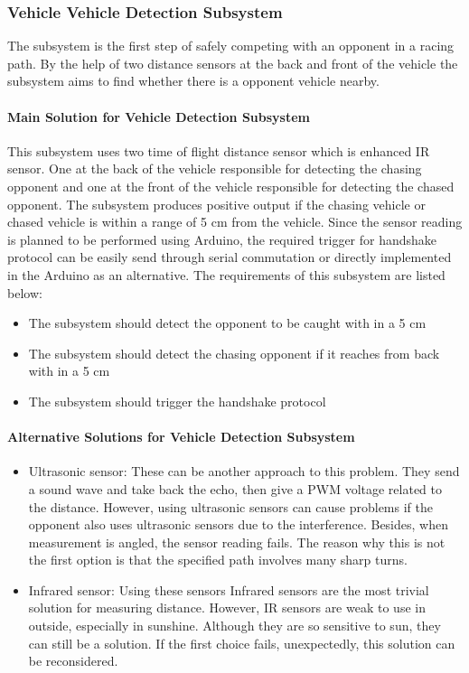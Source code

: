 \documentclass[a4paper,12pt]{article}
\begin{document}
	\subsubsection{Vehicle Vehicle Detection Subsystem}
	
		The subsystem is the first step of safely competing with an opponent in a racing path. By the help of two distance sensors at the back and front of the vehicle the subsystem aims to find whether there is a opponent vehicle nearby.
	
	\paragraph{Main Solution for  Vehicle Detection Subsystem}
	
	 This subsystem uses two time of flight distance sensor which is enhanced IR sensor. One at the back of the vehicle responsible for detecting the chasing opponent and one at the front of the vehicle responsible for detecting the chased opponent. The subsystem produces positive output if the chasing vehicle or chased vehicle is within a range of 5 cm from the vehicle. Since the sensor reading is planned to be performed using Arduino, the required trigger for handshake protocol can be  easily send through serial commutation or directly implemented in the Arduino as an alternative. The requirements of this subsystem are listed below:
	
	\begin{itemize}
		\item The subsystem should detect the opponent to be caught with in a 5 cm 
		\item The subsystem should detect the chasing opponent if it reaches from back with in a 5 cm 
		\item The subsystem should trigger the handshake protocol 
	\end{itemize}
	
	\paragraph{Alternative Solutions for Vehicle Detection Subsystem}
	\begin{itemize}
		\item {Ultrasonic sensor:} These can be another approach to this problem. They send a sound wave and take back the echo, then give a PWM voltage related to the distance. However, using ultrasonic sensors can cause problems if the opponent also uses ultrasonic sensors due to the interference. Besides, when measurement is angled, the sensor reading fails. The reason why this is not the first option is that the specified path involves many sharp turns.
		
		\item {Infrared sensor:} Using these sensors Infrared sensors are the most trivial solution for measuring distance. However, IR sensors are weak to use in outside, especially in sunshine. Although they are so sensitive to sun, they can still be a solution. If the first choice fails, unexpectedly, this solution can be reconsidered.
	\end{itemize}
	
\end{document}
